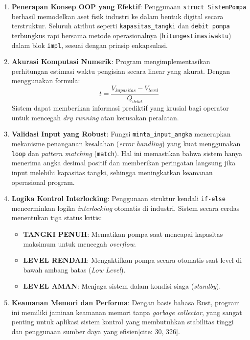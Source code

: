 \documentclass[12pt,a4paper]{article}
\begin{document}
\begin{enumerate}
    \item \textbf{Penerapan Konsep OOP yang Efektif}: Penggunaan \texttt{struct SistemPompa} berhasil memodelkan aset fisik industri ke dalam bentuk digital secara terstruktur. Seluruh atribut seperti \texttt{kapasitas\_tangki} dan \texttt{debit pompa} terbungkus rapi bersama metode operasionalnya (\texttt{hitungestimasiwaktu}) dalam blok \texttt{impl}, sesuai dengan prinsip enkapsulasi.
    
    \item \textbf{Akurasi Komputasi Numerik}: Program mengimplementasikan perhitungan estimasi waktu pengisian secara linear yang akurat. Dengan menggunakan formula:
    \begin{equation}
        t = \frac{V_{kapasitas} - V_{level}}{Q_{debit}}
    \end{equation}
    Sistem dapat memberikan informasi prediktif yang krusial bagi operator untuk mencegah \textit{dry running} atau kerusakan peralatan.
    
    \item \textbf{Validasi Input yang Robust}: Fungsi \texttt{minta\_input\_angka} menerapkan mekanisme penanganan kesalahan (\textit{error handling}) yang kuat menggunakan \texttt{loop} dan \textit{pattern matching} (\texttt{match}). Hal ini memastikan bahwa sistem hanya menerima angka desimal positif dan memberikan peringatan langsung jika input melebihi kapasitas tangki, sehingga meningkatkan keamanan operasional program.
    
    \item \textbf{Logika Kontrol Interlocking}: Penggunaan struktur kendali \texttt{if-else} mencerminkan logika \textit{interlocking} otomatis di industri. Sistem secara cerdas menentukan tiga status kritis:
    \begin{itemize}
        \item \textbf{TANGKI PENUH}: Mematikan pompa saat mencapai kapasitas maksimum untuk mencegah \textit{overflow}.
        \item \textbf{LEVEL RENDAH}: Mengaktifkan pompa secara otomatis saat level di bawah ambang batas (\textit{Low Level}).
        \item \textbf{LEVEL AMAN}: Menjaga sistem dalam kondisi siaga (\textit{standby}).
    \end{itemize}
    
    \item \textbf{Keamanan Memori dan Performa}: Dengan basis bahasa Rust, program ini memiliki jaminan keamanan memori tanpa \textit{garbage collector}, yang sangat penting untuk aplikasi sistem kontrol yang membutuhkan stabilitas tinggi dan penggunaan sumber daya yang efisien[cite: 30, 326].
\end{enumerate}
\end{document}
